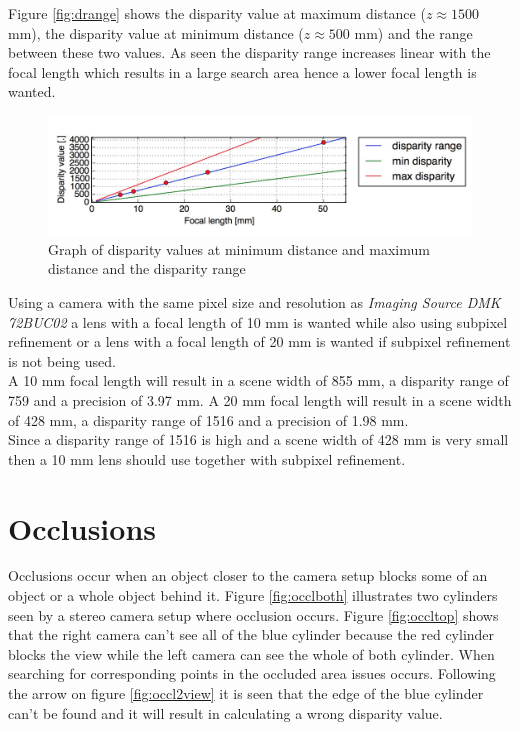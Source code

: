 Figure \vref{fig:drange} shows the disparity value at maximum distance ($z\approx 1500$ mm), the disparity value at minimum distance ($z \approx 500$ mm) and the range between these two values. As seen the disparity range increases linear with the focal length which results in a large search area hence a lower focal length is wanted.\\
\begin{figure}[ht!]
  \centering
  \includegraphics[width=1\textwidth]{figures/drange}
  \caption{Graph of disparity values at minimum distance and maximum distance and the disparity range}
  \label{fig:drange}
\end{figure}
Using a camera with the same pixel size and resolution as \textit{Imaging Source DMK 72BUC02} a lens with a focal length of 10 mm is wanted while also using subpixel refinement or a lens with a focal length of 20 mm is wanted if subpixel refinement is not being used. \\
A 10 mm focal length will result in a scene width of 855 mm, a disparity range of 759 and a precision of 3.97 mm. A 20 mm focal length will result in a scene width of 428 mm, a disparity range of 1516 and a precision of 1.98 mm.\\
Since a disparity range of 1516 is high and a scene width of 428 mm is very small then a 10 mm lens should use together with subpixel refinement.\\

\section{Occlusions}
Occlusions occur when an object closer to the camera setup blocks some of an object or a whole object behind it. Figure \ref{fig:occlboth} illustrates two cylinders seen by a stereo camera setup where occlusion occurs. Figure \vref{fig:occltop} shows that the right camera can't see all of the blue cylinder because the red cylinder blocks the view while the left camera can see the whole of both cylinder. When searching for corresponding points in the occluded area issues occurs. Following the arrow on figure \vref{fig:occl2view} it is seen that the edge of the blue cylinder can't be found and it will result in calculating a wrong disparity value. \\

